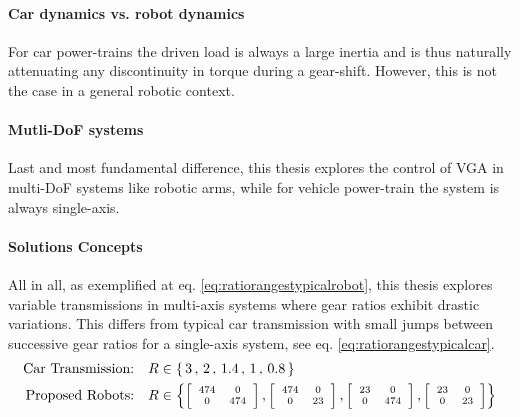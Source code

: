 \paragraph{Car dynamics vs. robot dynamics}
%
For car power-trains the driven load is always a large inertia and is thus naturally attenuating any discontinuity in torque during a gear-shift. However, this is not the case in a general robotic context. 

\paragraph{Mutli-DoF systems}
%
Last and most fundamental difference, this thesis explores the control of VGA in multi-DoF systems like robotic arms, while for vehicle power-train the system is always single-axis.

\paragraph{Solutions Concepts}
%
All in all, as exemplified at eq. \eqref{eq:ratiorangestypicalrobot}, this thesis explores variable transmissions in multi-axis systems where gear ratios exhibit drastic variations. This differs from typical car transmission with small jumps between successive gear ratios for a single-axis system, see eq. \eqref{eq:ratiorangestypicalcar}.
%
\begin{align}
  \text{Car Transmission:}& \quad R \in \{ \, 3 \, , \,  2 \, , \, 1.4 \, , \, 1 \, , \, 0.8 \, \} 
	\label{eq:ratiorangestypicalcar}
	\\
	\text{Proposed Robots:}& \quad R \in 
	\scriptsize
	\left \{
	\left[
	\begin{array}{c c}
	474 & 0 \\ 0 & 474
	\end{array} 
	\right]
	,
	\left[
	\begin{array}{c c}
	474 & 0 \\ 0 & 23
	\end{array} 
	\right]
	,
	\left[
	\begin{array}{c c}
	23 & 0 \\ 0 & 474
	\end{array} 
	\right]
	,
	\left[
	\begin{array}{c c}
	23 & 0 \\ 0 & 23
	\end{array} 
	\right]
	\right \}
 \label{eq:ratiorangestypicalrobot}
\end{align}


